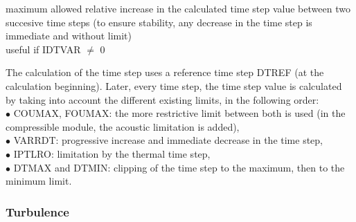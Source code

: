{maximum allowed relative increase in the calculated time step value
between two succesive time steps (to ensure stability, any decrease in the time step
is immediate and without limit)\\
useful if IDTVAR $\ne$ 0}


The calculation of the time step uses a reference time step DTREF (at
the calculation beginning). Later, every time step, the time step value
is calculated by taking into account the different existing limits, in
the following order: \\
\hspace*{1.cm}$\bullet$ COUMAX, FOUMAX: the more restrictive limit between
both is used (in the compressible module, the acoustic limitation is added),\\
\hspace*{1.cm}$\bullet$ VARRDT:  progressive increase and immediate
decrease in the time step,\\
\hspace*{1.cm}$\bullet$ IPTLRO: limitation by the thermal time step,\\
\hspace*{1.cm}$\bullet$ DTMAX and DTMIN: clipping of the time step to
the maximum, then to the minimum limit.\\


\subsubsection{Turbulence}


